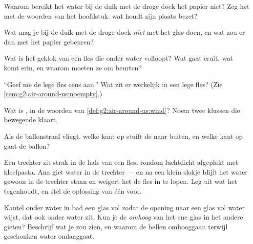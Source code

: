\begin{exercise}[$\star$]\label{exo:g2:air-around-us:3}
Waarom bereikt het water bij de duik met de droge doek het papier
niet? Zeg het met de woorden van het hoofdstuk: wat houdt zijn plaats
bezet?
\end{exercise}

\begin{exercise}[$\star$]\label{exo:g2:air-around-us:4}
Wat mag je bij de duik met de droge doek \emph{niet} met het glas
doen, en wat zou er dan met het papier gebeuren?
\end{exercise}

\begin{exercise}[$\star$]\label{exo:g2:air-around-us:5}
Wat is het geklok van een fles die onder water volloopt? Wat gaat
eruit, wat komt erin, en waarom moeten ze om beurten?
\end{exercise}

\begin{exercise}[$\star$]\label{exo:g2:air-around-us:6}
``Geef me de lege fles eens aan.'' Wat zit er werkelijk in een lege
fles? (Zie \cref{rem:g2:air-around-us:noempty}.)
\end{exercise}

\begin{exercise}[$\star$]\label{exo:g2:air-around-us:7}
Wat is , in de woorden van \cref{def:g2:air-around-us:wind}? Noem
twee klussen die bewegende  klaart.
\end{exercise}

\begin{exercise}[$\star$]\label{exo:g2:air-around-us:8}
Als de ballonstraal vliegt, welke kant op stuift de  naar buiten,
en welke kant op gaat de ballon?
\end{exercise}

\begin{exercise}[$\star\star$]\label{exo:g2:air-around-us:9}
Een trechter zit strak in de hals van een fles, rondom luchtdicht
afgeplakt met kleefpasta. Ana giet water in de trechter --- en na een
klein slokje blijft het water gewoon in de trechter staan en weigert
het de fles in te lopen. Leg uit wat het tegenhoudt, en stel de
oplossing van één  voor.
\end{exercise}

\begin{exercise}[$\star\star$]\label{exo:g2:air-around-us:10}
Kantel onder water in bad een glas vol  zodat de opening naar een
glas vol water wijst, dat ook onder water zit. Kun je de 
\emph{omhoog} van het ene glas in het andere gieten? Beschrijf wat je
zou zien, en waarom de bellen omhooggaan terwijl geschonken water
omlaaggaat.
\end{exercise}
